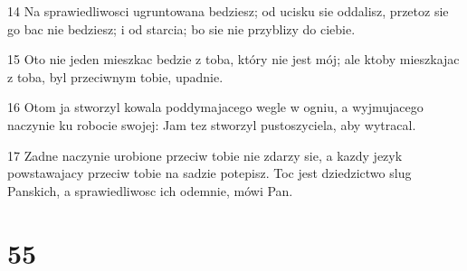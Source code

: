 \par 14 Na sprawiedliwosci ugruntowana bedziesz; od ucisku sie oddalisz, przetoz sie go bac nie bedziesz; i od starcia; bo sie nie przyblizy do ciebie.
\par 15 Oto nie jeden mieszkac bedzie z toba, który nie jest mój; ale ktoby mieszkajac z toba, byl przeciwnym tobie, upadnie.
\par 16 Otom ja stworzyl kowala poddymajacego wegle w ogniu, a wyjmujacego naczynie ku robocie swojej: Jam tez stworzyl pustoszyciela, aby wytracal.
\par 17 Zadne naczynie urobione przeciw tobie nie zdarzy sie, a kazdy jezyk powstawajacy przeciw tobie na sadzie potepisz. Toc jest dziedzictwo slug Panskich, a sprawiedliwosc ich odemnie, mówi Pan.

\chapter{55}

